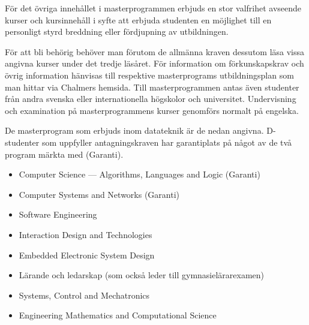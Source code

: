 \documentclass[twocolumn]{article}
\begin{document}
För det övriga innehållet i masterprogrammen erbjuds en stor valfrihet
avseende kurser och kursinnehåll i syfte att erbjuda studenten en
möjlighet till en personligt styrd breddning eller fördjupning av
utbildningen.

För att bli behörig behöver man förutom de allmänna kraven dessutom
läsa vissa angivna kurser under det tredje läsåret. För information om
förkunskapskrav och övrig information hänvisas till respektive
masterprograms utbildningsplan som man hittar via Chalmers
hemsida. Till masterprogrammen antas även studenter från andra svenska
eller internationella högskolor och universitet.  Undervisning och
examination på masterprogrammens kurser genomförs normalt på engelska.

De masterprogram som erbjuds inom datateknik är de nedan
angivna. D-studenter som uppfyller antagningskraven har garantiplats
på något av de två program märkta med (Garanti).

\begin{itemize}
\item \foreignlanguage{british}{Computer Science --- Algorithms,
    Languages and Logic} (Garanti)
\item \foreignlanguage{british}{Computer Systems and Networks} (Garanti)
\item \foreignlanguage{british}{Software Engineering}
\item \foreignlanguage{british}{Interaction Design and Technologies}
\item \foreignlanguage{british}{Embedded Electronic System Design}
\item Lärande och ledarskap (som också leder till gymnasielärarexamen)
\item \foreignlanguage{british}{Systems, Control and Mechatronics}
\item \foreignlanguage{british}{Engineering Mathematics and Computational Science}
\end{itemize}
\end{document}
